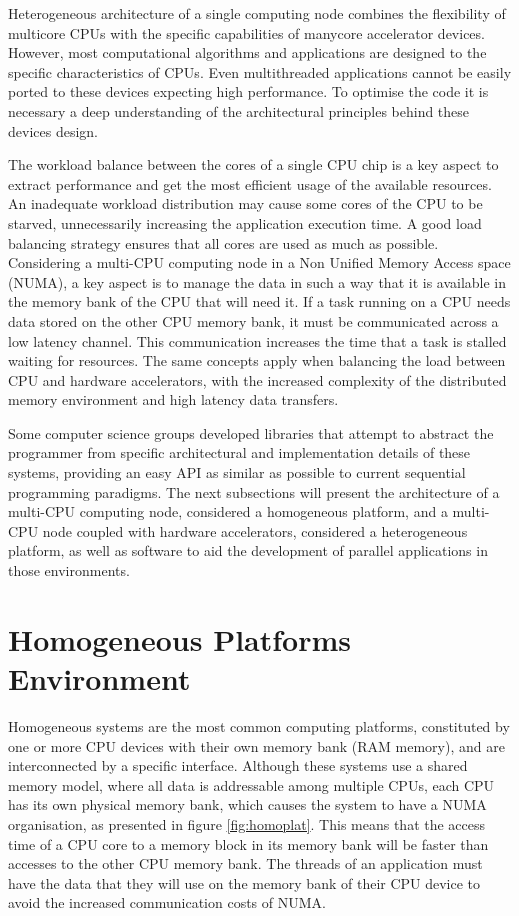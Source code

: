Heterogeneous architecture of a single computing node combines the flexibility of multicore CPUs with the specific capabilities of manycore accelerator devices. However, most computational algorithms and applications are designed to the specific characteristics of CPUs. Even multithreaded applications cannot be easily ported to these devices expecting high performance. To optimise the code it is necessary a deep understanding of the architectural principles behind these devices design.

The workload balance between the cores of a single CPU chip is a key aspect to extract performance and get the most efficient usage of the available resources. An inadequate workload distribution may cause some cores of the CPU to be starved, unnecessarily increasing the application execution time. A good load balancing strategy ensures that all cores are used as much as possible. Considering a multi-CPU computing node in a Non Unified Memory Access space (NUMA), a key aspect is to manage the data in such a way that it is available in the memory bank of the CPU that will need it. If a task running on a CPU needs data stored on the other CPU memory bank, it must be communicated across a low latency channel. This communication increases the time that a task is stalled waiting for resources. The same concepts apply when balancing the load between CPU and hardware accelerators, with the increased complexity of the distributed memory environment and high latency data transfers.

Some computer science groups developed libraries that attempt to abstract the programmer from specific architectural and implementation details of these systems, providing an easy API as similar as possible to current sequential programming paradigms. The next subsections will present the architecture of a multi-CPU computing node, considered a homogeneous platform, and a multi-CPU node coupled with hardware accelerators, considered a heterogeneous platform, as well as software to aid the development of parallel applications in those environments.

\section{Homogeneous Platforms Environment}
\label{homo_systems}

Homogeneous systems are the most common computing platforms, constituted by one or more CPU devices with their own memory bank (RAM memory), and are interconnected by a specific interface. Although these systems use a shared memory model, where all data is addressable among multiple CPUs, each CPU has its own physical memory bank, which causes the system to have a NUMA organisation, as presented in figure \ref{fig:homoplat}. This means that the access time of a CPU core to a memory block in its memory bank will be faster than accesses to the other CPU memory bank. The threads of an application must have the data that they will use on the memory bank of their CPU device to avoid the increased communication costs of NUMA.

